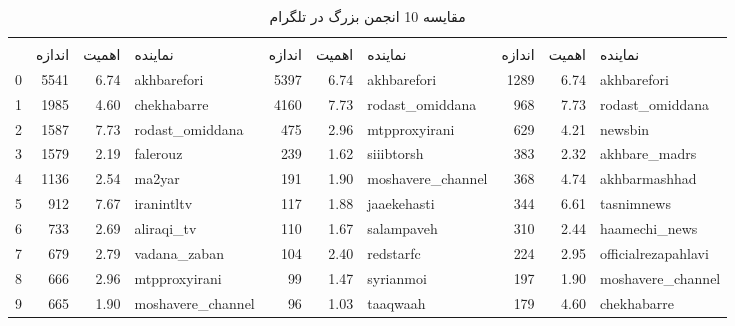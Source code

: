 \documentclass{article}
\begin{document}
	\begin{table}[h!]
		\centering
		\caption{مقایسه 10 انجمن بزرگ در تلگرام}
		\label{tab:telegram}
		\begin{tabular}{lrrlrrlrrl}
			\toprule
			& \multicolumn{3}{c}{\lr{Louvain}} & \multicolumn{3}{c}{\lr{Label Propagation}} & \multicolumn{3}{c}{\lr{Infomap}} \\
			\cmidrule(lr){2-4} \cmidrule(lr){5-7} \cmidrule(lr){8-10}
			& اندازه & اهمیت & نماینده & اندازه & اهمیت & نماینده & اندازه & اهمیت & نماینده \\
			0 & 5541 & 6.74 & akhbarefori & 5397 & 6.74 & akhbarefori & 1289 & 6.74 & akhbarefori \\
			1 & 1985 & 4.60 & chekhabarre & 4160 & 7.73 & rodast\_omiddana & 968 & 7.73 & rodast\_omiddana \\
			2 & 1587 & 7.73 & rodast\_omiddana & 475 & 2.96 & mtpproxyirani & 629 & 4.21 & newsbin \\
			3 & 1579 & 2.19 & falerouz & 239 & 1.62 & siiibtorsh & 383 & 2.32 & akhbare\_madrs \\
			4 & 1136 & 2.54 & ma2yar & 191 & 1.90 & moshavere\_channel & 368 & 4.74 & akhbarmashhad \\
			5 & 912 & 7.67 & iranintltv & 117 & 1.88 & jaaekehasti & 344 & 6.61 & tasnimnews \\
			6 & 733 & 2.69 & aliraqi\_tv & 110 & 1.67 & salampaveh & 310 & 2.44 & haamechi\_news \\
			7 & 679 & 2.79 & vadana\_zaban & 104 & 2.40 & redstarfc & 224 & 2.95 & officialrezapahlavi \\
			8 & 666 & 2.96 & mtpproxyirani & 99 & 1.47 & syrianmoi & 197 & 1.90 & moshavere\_channel \\
			9 & 665 & 1.90 & moshavere\_channel & 96 & 1.03 & taaqwaah & 179 & 4.60 & chekhabarre \\
			\bottomrule
		\end{tabular}
	\end{table}
	
\end{document}
